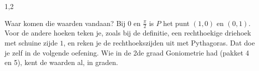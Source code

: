\begin{alleenvoor}{1,2}

Waar komen die waarden vandaan? Bij $0$ en $\frac{\pi}{2}$ is $P$ het punt $(1, 0)$ en $(0, 1)$. Voor de andere hoeken teken je, zoals bij de definitie, een rechthoekige driehoek met schuine zijde $1$, en reken je de rechthoekszijden uit met Pythagoras. Dat doe je zelf in de volgende oefening. Wie in de 2de graad Goniometrie had (pakket 4 en 5), kent de waarden al, in graden.

\begin{oefeningen}
\end{oefeningen}
\end{alleenvoor}


